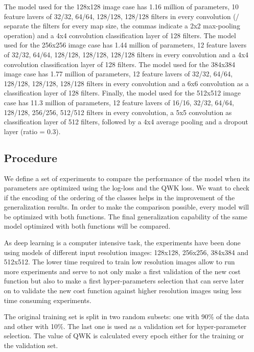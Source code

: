 \documentclass[times,twocolumn,final,authoryear]{elsarticle}
\begin{document}
The model used for the 128x128 image case has 1.16 million of parameters, 10 feature lavers of 32/32, 64/64, 128/128, 128/128 filters in every convolution (/ separate the filters for every map size, the commas indicate a 2x2 max-pooling operation) and a 4x4 convolution classification layer of 128 filters. The model used for the 256x256 image case has 1.44 million of parameters, 12 feature lavers of 32/32, 64/64, 128/128, 128/128, 128/128 filters in every convolution and a 4x4 convolution classification layer of 128 filters. The model used for the 384x384 image case has 1.77 million of parameters, 12 feature lavers of 32/32, 64/64, 128/128, 128/128, 128/128 filters in every convolution and a 6x6 convolution as a classification layer of 128 filters. Finally, the model used for the 512x512 image case has 11.3 million of parameters, 12 feature lavers of 16/16, 32/32, 64/64, 128/128, 256/256, 512/512 filters in every convolution, a 5x5 convolution as classification layer of 512 filters, followed by a 4x4 average pooling and a dropout layer (ratio = 0.3).

\subsection{Procedure}

We define a set of experiments to compare the performance of the model when its parameters are optimized using the log-loss and the QWK loss. We want to check if the encoding of the ordering of the classes helps in the improvement of the generalization results. In order to make the comparison possible, every model will be optimized with both functions. The final generalization capability of the same model optimized with both functions will be compared. 

As deep learning is a computer intensive task, the experiments have been done using models of different input resolution images: 128x128, 256x256, 384x384 and 512x512. The lower time required to train low resolution images allow to run more experiments and serve to not only make a first validation of the new cost function but also to make a first hyper-parameters selection that can serve later on to validate the new cost function against higher resolution images using less time consuming experiments.

The original training set is split in two random subsets: one with 90\% of the data and other with 10\%. The last one is used as a validation set for hyper-parameter selection. The value of QWK is calculated every epoch either for the training or the validation set. 
\end{document}
